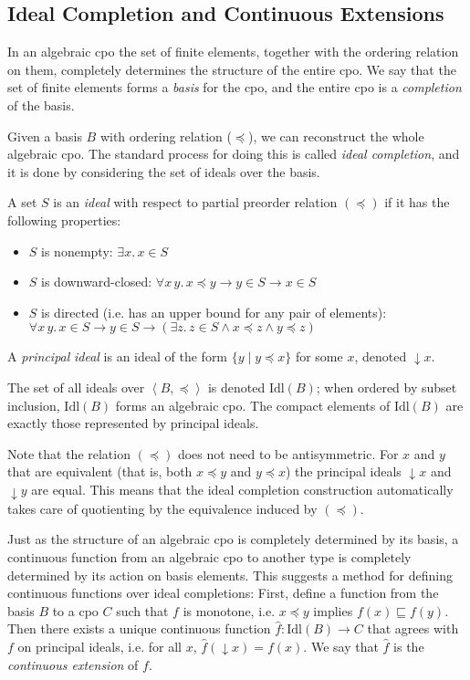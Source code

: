 \documentclass{llncs}
\begin{document}
\subsection{Ideal Completion and Continuous Extensions}

In an algebraic cpo the set of finite elements, together with the
ordering relation on them, completely determines the structure of the
entire cpo.  We say that the set of finite elements forms a
\emph{basis} for the cpo, and the entire cpo is a \emph{completion} of
the basis.

Given a basis $B$ with ordering relation ($\preceq$), we can
reconstruct the whole algebraic cpo. The standard process for doing
this is called \emph{ideal completion}, and it is done by considering
the set of ideals over the basis.

\begin{definition}
A set $S$ is an \emph{ideal} with respect to partial preorder relation
$(\preceq)$ if it has the following properties:
\begin{itemize}
\item $S$ is nonempty: $\exists x.\, x\in S$
\item $S$ is downward-closed: $\forall x\, y.\, x\preceq y\longrightarrow y\in S\longrightarrow x\in S$
\item $S$ is directed (i.e. has an upper bound for any pair of elements):\\
 $\forall x\, y.\, x\in S\longrightarrow y\in S\longrightarrow(\exists z.\, z\in S\wedge x\preceq z\wedge y\preceq z)$
\end{itemize}
A \emph{principal} \emph{ideal} is an ideal of the form $\{y \mid y\preceq x\}$
for some $x$, denoted $\downarrow\! x$.
\end{definition}
The set of all ideals over $\left\langle B,\preceq\right\rangle $ is
denoted $\mathrm{Idl}(B)$; when ordered by subset inclusion,
$\mathrm{Idl}(B)$ forms an algebraic cpo. The compact elements of
$\mathrm{Idl}(B)$ are exactly those represented by principal ideals.

Note that the relation $(\preceq)$ does not need to be antisymmetric.
For $x$ and $y$ that are equivalent (that is, both $x\preceq y$
and $y\preceq x$) the principal ideals $\downarrow\! x$ and $\downarrow\! y$
are equal. This means that the ideal completion construction automatically
takes care of quotienting by the equivalence induced by $(\preceq)$.

Just as the structure of an algebraic cpo is completely determined by
its basis, a continuous function from an algebraic cpo to another type
is completely determined by its action on basis elements.  This
suggests a method for defining continuous functions over ideal
completions: First, define a function from the basis $B$ to a cpo $C$
such that $f$ is monotone, i.e.  $x\preceq y$ implies $f(x)\sqsubseteq
f(y)$.  Then there exists a unique continuous function
$\widehat{f}:\mathrm{Idl}(B)\rightarrow C$ that agrees with $f$ on
principal ideals, i.e. for all $x$, $\widehat{f}(\downarrow\!
x)=f(x)$.  We say that $\widehat{f}$ is the \emph{continuous
  extension} of $f$.
\end{document}
